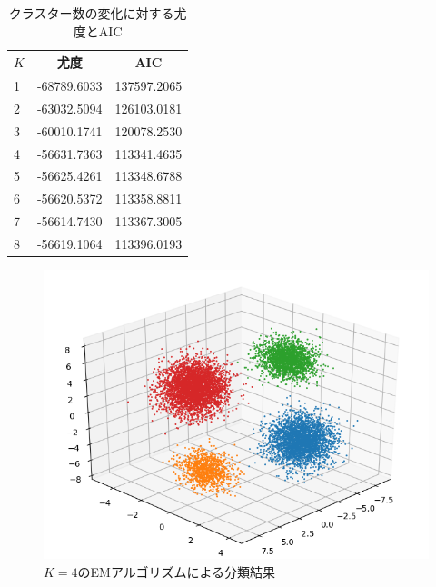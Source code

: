 \documentclass[uplatex]{jsarticle}
\begin{document}
\begin{table}[h]
\centering
\label{tab:clusters}
\caption{クラスター数の変化に対する尤度とAIC}
\begin{tabular}{|l|c|c|}
\hline
$K$ & 尤度  & AIC         \\ \hline
1        & -68789.6033 & 137597.2065 \\ \hline
2        & -63032.5094 & 126103.0181 \\ \hline
3        & -60010.1741 & 120078.2530 \\ \hline
4        & -56631.7363 & 113341.4635 \\ \hline
5        & -56625.4261 & 113348.6788 \\ \hline
6        & -56620.5372 & 113358.8811 \\ \hline
7        & -56614.7430 & 113367.3005 \\ \hline
8        & -56619.1064 & 113396.0193 \\ \hline
\end{tabular}
\end{table}

\begin{figure}[h]
\centering
\includegraphics[width=0.6\linewidth]{./OMLkHtQWay.png}
\caption{$K=4$のEMアルゴリズムによる分類結果}
\label{fig:result}
\end{figure}
\end{document}
